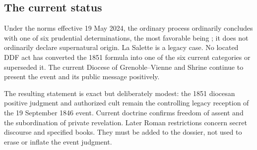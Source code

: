 \subsection{The current status}

Under the norms effective 19 May 2024, the ordinary process ordinarily concludes with one of six prudential determinations, the most favorable being ; it does not ordinarily declare supernatural origin. La Salette is a legacy case. No located DDF act has converted the 1851 formula into one of the six current categories or superseded it. The current Diocese of Grenoble--Vienne and Shrine continue to present the event and its public message positively.

The resulting statement is exact but deliberately modest: the 1851 diocesan positive judgment and authorized cult remain the controlling legacy reception of the 19 September 1846 event. Current doctrine confirms freedom of assent and the subordination of private revelation. Later Roman restrictions concern secret discourse and specified books. They must be added to the dossier, not used to erase or inflate the event judgment.
